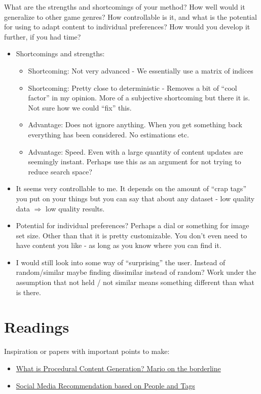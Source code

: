 \documentclass[]{article}
\begin{document}


\begin{framed}
What are the strengths and shortcomings of your method? How well would it generalize to other game genres? How controllable is it, and what is the potential for using to adapt content to individual preferences? How would you develop it further, if you had time?
\end{framed}
\begin{itemize}
\item Shortcomings and strengths:
	\begin{itemize}
	\item Shortcoming: Not very advanced - We essentially use a matrix of indices
	\item Shortcoming: Pretty close to deterministic - Removes a bit of ``cool factor'' in my opinion. More of a subjective shortcoming but there it is. Not sure how we could ``fix'' this.
	\item Advantage: Does not ignore anything. When you get something back everything has been considered. No estimations etc.
	\item Advantage: Speed. Even with a large quantity of content updates are seemingly instant. Perhaps use this as an argument for not trying to reduce search space?
	\end{itemize}
\item  It seems very controllable to me. It depends on the amount of ``crap tags'' you put on your things but you can say that about any dataset - low quality data $\Rightarrow$ low quality results. 
\item Potential for individual preferences? Perhaps a dial or something for image set size. Other than that it is pretty customizable. You don't even need to have content you like - as long as you know where you can find it.
\item I would still look into some way of ``surprising'' the user. Instead of random/similar maybe finding dissimilar instead of random? Work under the assumption that not held / not similar means something different than what is there.
\end{itemize}
\section{Readings}
Inspiration or papers with important points to make:
\begin{itemize}
\item \href{http://julian.togelius.com/Togelius2011What.pdf}{What is Procedural Content Generation? Mario on the borderline}
\item \href{http://delivery.acm.org/10.1145/1840000/1835484/p194-guy.pdf?ip=130.226.142.243&id=1835484&acc=ACTIVE\%20SERVICE&key=36332CD97FA87885\%2E6A18944DEFDDF4C0\%2E4D4702B0C3E38B35\%2E4D4702B0C3E38B35&CFID=605494385&CFTOKEN=58221236&__acm__=1417798342_c9dde7c05e2a19158dcc16e124ca0723}{Social Media Recommendation based on People and Tags }
\end{itemize}



\end{document}
